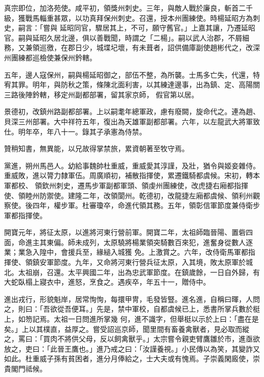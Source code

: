 \begin{pinyinscope}
 真宗即位，加洛苑使。咸平初，領獎州刺史。三年，與敵人戰於廉良，斬首二千級，獲戰馬輜重甚眾，以功真拜保州刺史。召還，授本州團練使。時楊延昭方為刺史，嗣言：「嘗與
 延昭同官，驟居其上，不可，願守舊官。」上嘉其讓，乃遷延昭官。嗣與延昭久居北邊，俱以善戰聞，時謂之「二楊」。嗣以武人治郡，不屑細務，又兼領巡徼，在郡日少，城堞圮壞，有未葺者，詔供備庫副使趙彬代之，改深州團練都巡檢使兼保州鈐轄。



 五年，邊人寇保州，嗣與楊延昭御之，部伍不整，為所襲。士馬多亡失，代還，特宥其罪。明年，與防秋之策，條陳北面利害，以其練達邊事，出為鎮、定、高陽關三路後陣鈐轄，移定州副都部署，留其家京師，
 假官第以居。



 景德初，改鎮州路副都部署。上以嗣耄年總軍政，慮有廢闕，旋命代之。連為趙、貝深三州部署。大中祥符五年，復出為天雄軍副都部署。六年，以左龍武大將軍致仕。明年卒，年八十一。錄其子承憲為侍禁。



 贊稍知書，無異能，以兄故得掌禁旅，累資朝著至牧守焉。



 黨進，朔州馬邑人。幼給事魏帥杜重威，重威愛其淳謹，及壯，猶令與姬妾雜侍。重威敗，進以膂力隸軍伍。周廣順初，補散指揮使，累遷鐵騎都虞候。宋初，轉本軍都校、
 領欽州刺史，遷馬步軍副都軍頭、領虔州團練使，改虎捷右廂都指揮使、領睦州防禦使。建隆二年，改領閬州。乾德初，改龍捷左廂都虞候、領利州觀察使。後四年，權步軍。杜審瓊卒，命進代領其務。五年，領彰信軍節度兼侍衛步軍都指揮使。



 開寶元年，將征太原，以進將河東行營前軍。開寶二年，太祖師臨晉陽、置砦四面，命進主其東偏。師未成列，太原驍將楊業領突騎數百來犯，進奮身從數人逐業；業急入隍中，會援兵至，緣縋入城獲
 免。上激賞之。六年，改侍衛馬軍都指揮使、領鎮安軍節度。九年，又命將河東行營兵征太原，入其境，敗太原軍於城北。太祖崩，召還。太平興國二年，出為忠武軍節度。在鎮歲餘，一日自外歸，有大蛇臥榻上寢衣中，進怒，烹食之。遇疾卒，年五十一，贈侍中。



 進出戎行，形貌魁岸，居常恂恂，每擐甲冑，毛發皆豎。進名進，自稱曰暉，人問之，則曰：「吾欲從吾便耳。」先是，禁中軍校，自都虞候已上，悉書所掌兵數於梃上，如笏記焉。太祖一日問進所掌幾
 何，進不識字，但舉梃以示於上曰：「盡在是矣。」上以其樸直，益厚之。嘗受詔巡京師，聞里間有畜養禽獸者，見必取而縱之，罵曰：「買肉不將供父母，反以飼禽獸乎。」太宗嘗令親吏臂鷹雛於市，進亟欲放之，吏曰：「此晉王鷹也。」進乃戒之曰：「汝謹養視。」小民傳以為笑，其變詐又如此。杜重威子孫有貧困者，進分月俸給之，士大夫或有愧焉。子崇義閑廄使，崇貴閣門祗候。




\end{pinyinscope}
